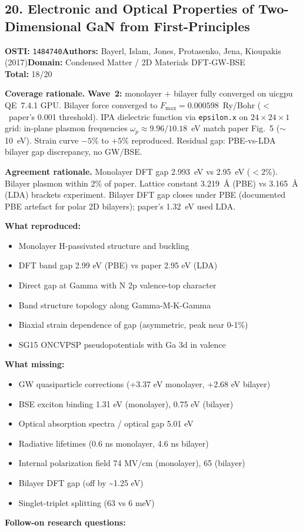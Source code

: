 \subsection{20. Electronic and Optical Properties of Two-Dimensional GaN from First-Principles}
\textbf{OSTI:} \texttt{1484740}\quad\textbf{Authors:} Bayerl, Islam, Jones, Protasenko, Jena, Kioupakis (2017)\quad\textbf{Domain:} Condensed Matter / 2D Materials DFT-GW-BSE\\
\quad{}\quad\textbf{Total:} 18/20\par\smallskip
\noindent\textbf{Coverage rationale.} \textbf{Wave~2:} monolayer $+$ bilayer fully converged on uicgpu QE~7.4.1 GPU. Bilayer force converged to $F_{\max}=0.000598$~Ry/Bohr ($<$~paper's 0.001 threshold). IPA dielectric function via \texttt{epsilon.x} on $24\times24\times1$ grid: in-plane plasmon frequencies $\omega_p \approx 9.96/10.18$~eV match paper Fig.~5 ($\sim$10~eV). Strain curve $-5\%$ to $+5\%$ reproduced. Residual gap: PBE-vs-LDA bilayer gap discrepancy, no GW/BSE.\par
\noindent\textbf{Agreement rationale.} Monolayer DFT gap 2.993~eV vs 2.95~eV ($<2\%$). Bilayer plasmon within 2\% of paper. Lattice constant 3.219~\AA{} (PBE) vs 3.165~\AA{} (LDA) brackets experiment. Bilayer DFT gap closes under PBE (documented PBE artefact for polar 2D bilayers); paper's 1.32~eV used LDA.\par\smallskip
\noindent\textbf{What reproduced:}
\begin{itemize}[leftmargin=1.4em,itemsep=0.2em,topsep=0.2em]
\item Monolayer H-passivated structure and buckling
\item DFT band gap 2.99 eV (PBE) vs paper 2.95 eV (LDA)
\item Direct gap at Gamma with N 2p valence-top character
\item Band structure topology along Gamma-M-K-Gamma
\item Biaxial strain dependence of gap (asymmetric, peak near 0-1\%)
\item SG15 ONCVPSP pseudopotentials with Ga 3d in valence
\end{itemize}\noindent\textbf{What missing:}
\begin{itemize}[leftmargin=1.4em,itemsep=0.2em,topsep=0.2em]
\item GW quasiparticle corrections (+3.37 eV monolayer, +2.68 eV bilayer)
\item BSE exciton binding 1.31 eV (monolayer), 0.75 eV (bilayer)
\item Optical absorption spectra / optical gap 5.01 eV
\item Radiative lifetimes (0.6 ns monolayer, 4.6 ns bilayer)
\item Internal polarization field 74 MV/cm (monolayer), 65 (bilayer)
\item Bilayer DFT gap (off by \textasciitilde{}1.25 eV)
\item Singlet-triplet splitting (63 vs 6 meV)
\end{itemize}\noindent\textbf{Follow-on research questions:}
